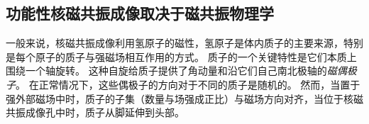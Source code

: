 \subsection{功能性核磁共振成像取决于磁共振物理学}

一般来说，核磁共振成像利用氢原子的磁性，氢原子是体内质子的主要来源，特别是每个原子的质子与强磁场相互作用的方式。
质子的一个关键特性是它们本质上围绕一个轴旋转。
这种自旋给质子提供了角动量和沿它们自己南北极轴的\textit{磁偶极子}。
在正常情况下，这些偶极子的方向对于不同的质子是随机的。
然而，当置于强外部磁场中时，质子的子集（数量与场强成正比）与磁场方向对齐，当位于核磁共振成像孔中时，质子从脚延伸到头部。



